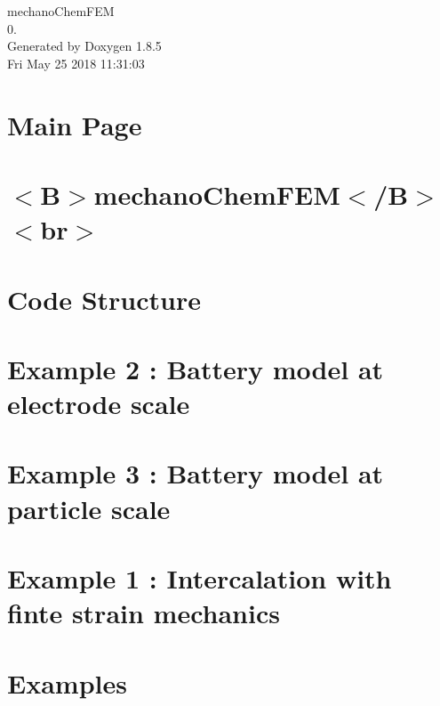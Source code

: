 \documentclass[twoside]{book}
\newcommand{\clearemptydoublepage}{%
  \newpage{\pagestyle{empty}\cleardoublepage}%
}
\begin{document}
\begin{titlepage}
\vspace*{7cm}
\begin{center}%
{\Large mechano\-Chem\-F\-E\-M \\[1ex]\large 0. }\\
\vspace*{1cm}
{\large Generated by Doxygen 1.8.5}\\
\vspace*{0.5cm}
{\small Fri May 25 2018 11:31:03}\\
\end{center}
\end{titlepage}
\clearemptydoublepage
\tableofcontents
\clearemptydoublepage
{}

\chapter{Main Page}
\label{index}\hypertarget{index}{}
\chapter{$<$B$>$mechano\-Chem\-F\-E\-M$<$/\-B$>$$<$br$>$}
\label{md_doxygen_readme}

\chapter{Code Structure}
\label{codestructure}

\chapter{Example 2 \-: Battery model at electrode scale}
\label{battery_electrode_scale}

\chapter{Example 3 \-: Battery model at particle scale}
\label{battery_particle}

\chapter{Example 1 \-: Intercalation with finte strain mechanics}
\label{_intercalation}

\chapter{Examples}
\label{examples}

\end{document}
